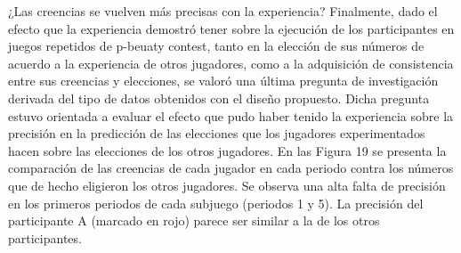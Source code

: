 	¿Las creencias se vuelven más precisas con la experiencia?
Finalmente, dado el efecto que la experiencia demostró tener sobre la ejecución de los participantes en juegos repetidos de p-beuaty contest, tanto en la elección de sus números de acuerdo a la experiencia de otros jugadores, como a la adquisición de consistencia entre sus creencias y elecciones, se valoró una última pregunta de investigación derivada del tipo de datos obtenidos con el diseño propuesto. Dicha pregunta estuvo orientada a evaluar el efecto que pudo haber tenido la experiencia sobre la precisión en la predicción de las elecciones que los jugadores experimentados hacen sobre las elecciones de los otros jugadores.
En las Figura 19 se presenta la comparación de las creencias de cada jugador en cada periodo contra los números que de hecho eligieron los otros jugadores. Se observa una alta falta de precisión en los primeros periodos de cada subjuego (periodos 1 y 5). La precisión del participante A (marcado en rojo) parece ser similar a la de los otros participantes.
   
   
   
   
   
   
   
